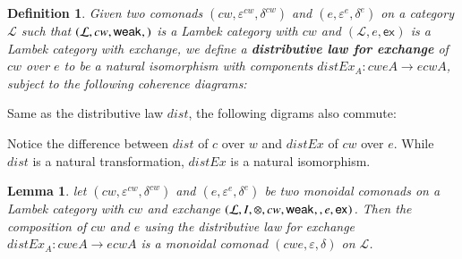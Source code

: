 \documentclass{article}
\newtheorem{lemma}[theorem]{Lemma}
\newtheorem{definition}[theorem]{Definition}
\let\mto\to
\let\to\relax
\newcommand{\to}{\rightarrow}
\let\c\relax
\newcommand{\cat}[1]{\mathcal{#1}}
\newcommand{\w}[1]{\mathsf{weak}_{#1}}
\newcommand{\c}[1]{\mathsf{contra}_{#1}}
\newcommand{\e}[1]{\mathsf{ex}_{#1}}
\begin{document}
\begin{definition}
  \label{def:distEx}
  Given two comonads $(cw,\varepsilon^{cw},\delta^{cw})$ and
  $(e,\varepsilon^e,\delta^e)$ on a category $\cat{L}$ such that
  $(\cat{L},cw,\w{},\c{})$ is a Lambek category with $cw$ and
  $(\cat{L},e,\e{})$ is a Lambek category with exchange, we define a
  \textbf{distributive law for exchange} of $cw$ over $e$ to be a natural
  isomorphism with components $distEx_A:cweA\mto ecwA$, subject to the
  following coherence diagrams:
\end{definition}
Same as the distributive law $dist$, the following digrams also commute:

Notice the difference between $dist$ of $c$ over $w$ and $distEx$ of $cw$
over $e$. While $dist$ is a natural transformation, $distEx$ is a natural
isomorphism.


\begin{lemma}
  \label{lem:compose-!e}
  let $(cw,\varepsilon^{cw},\delta^{cw})$ and $(e,\varepsilon^e,\delta^e)$
  be two monoidal comonads on a Lambek category with $cw$ and exchange
  $(\cat{L},I,\otimes,cw,\w{},\c{},e,\e{})$. Then the composition of $cw$
  and $e$ using the distributive law for exchange $distEx_A:cweA\mto ecwA$
  is a monoidal comonad $(cwe,\varepsilon,\delta)$ on $\cat{L}$.
\end{lemma}
\end{document}
